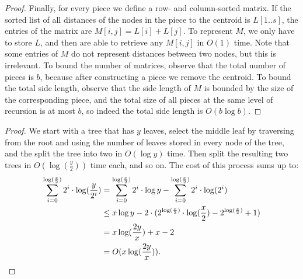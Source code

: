 \documentclass[a4paper,UKenglish]{lipics-v2016}
\theoremstyle{plain}
\begin{document}
\begin{proof}
Finally, for every piece we define a row- and column-sorted matrix. If the sorted list of all distances of the nodes in the piece to the
centroid is $L[1..s]$, the entries of the matrix are $M[i,j]=L[i]+L[j]$. To represent $M$, we only have to store $L$, and then are able to
retrieve any $M[i,j]$ in $O(1)$ time. Note that some entries of $M$ do not represent distances between two nodes, but this is irrelevant.
To bound the number of matrices, observe that the total number of pieces is $b$, because after constructing a piece we remove the centroid.
To bound the total side length, observe that the side length of $M$ is bounded by the size of the corresponding piece, and the total size
of all pieces at the same level of recursion is at most $b$, so indeed the total side length is $O(b\log b)$.
\end{proof}

\runningtimetoobtainsmalltreeslemma*

\begin{proof}
We start with a tree that has $y$ leaves, select the middle leaf by traversing from the root and using the number of leaves stored in every node of the tree, and the split the tree into two in $O(\log y)$ time. Then split the resulting two trees in $O(\log(\frac{y}{2}))$ time each, and so on. The cost of this process sums up to:
\begin{align*}
 \sum_{i=0}^{\log (\frac{x}{2})} 2^i \cdot \log (\frac{y}{2^i}) & = \sum_{i=0}^{\log (\frac{x}{2})} 2^i \cdot \log y - \sum_{i=0}^{\log (\frac{x}{2})} 2^i \cdot \log (2^i)  \\
& \leq x \log y - 2 \cdot (2^{ \log ( \frac{x}{2})} \cdot \log ( \frac{x}{2}) - 2^{ \log ( \frac{x}{2})}+1)  \\
&= x \log (\frac{2y}{x}) + x -2 \\
& = O(x \log (\frac{2y}{x})) .\qedhere
\end{align*}
\end{proof}

\nlognweighted*
\end{document}
